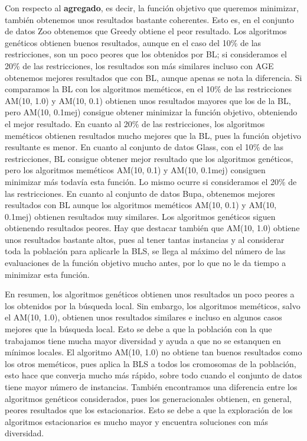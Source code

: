 Con respecto al \textbf{agregado}, es decir, la función objetivo que queremos minimizar, también obtenemos unos resultados bastante coherentes. Esto es, en el conjunto de datos Zoo obtenemos que Greedy obtiene el peor resultado. Los algoritmos genéticos obtienen buenos resultados, aunque en el caso del 10\% de las restricciones, 
son un poco peores que los obtenidos por BL; si consideramos el 20\% de las restricciones, los resultados son más similares incluso con AGE obtenemos mejores resultados que con BL, aunque apenas se nota la diferencia. Si comparamos la BL con los algoritmos meméticos, en el 10\% de las restricciones AM(10, 1.0) y AM(10, 0.1) obtienen unos resultados mayores que los de la BL,
pero AM(10, 0.1mej) consigue obtener minimizar la función objetivo, obteniendo el  mejor resultado. En cuanto al 20\% de las restricciones, los algoritmos meméticos obtienen resultados mucho mejores que la BL, pues la función objetivo resultante es menor.
En cuanto al conjunto de datos Glass, con el 10\% de las restricciones, BL consigue obtener mejor resultado que los algoritmos genéticos, pero los algoritmos meméticos AM(10, 0.1) y AM(10, 0.1mej) consiguen minimizar más todavía esta función. Lo mismo ocurre si consideramos el 20\% de las restricciones.
En cuanto al conjunto de datos Bupa, obtenemos mejores resultados con BL aunque los algoritmos meméticos AM(10, 0.1) y AM(10, 0.1mej) obtienen resultados muy similares. Los algoritmos genéticos siguen obtienendo resultados peores. Hay que destacar también que AM(10, 1.0) obtiene unos resultados bastante altos, pues al tener tantas instancias y al considerar toda la población para aplicarle la BLS,
se llega al máximo del número de las evaluaciones de la función objetivo mucho antes, por lo que no le da tiempo a minimizar esta función.

En resumen, los algoritmos genéticos obtienen unos resultados un poco peores a los obtenidos por la búsqueda local. Sin embargo, los algoritmos meméticos, salvo el AM(10, 1.0), obtienen unos resultados similares e incluso en algunos casos mejores que la búsqueda local.
Esto se debe a que la población con la que trabajamos tiene mucha mayor diversidad y ayuda a que no se estanquen en mínimos locales. 
El algoritmo AM(10, 1.0) no obtiene tan buenos resultados como los otros meméticos, pues aplica la BLS a todos los cromosomas de la población,
esto hace que converja mucho más rápido, sobre todo cuando el conjunto de datos tiene mayor número de instancias.
También encontramos una diferencia entre los algoritmos genéticos considerados, pues los generacionales obtienen, en general, peores resultados que los estacionarios. Esto se debe a que la exploración de los algoritmos estacionarios es mucho mayor y encuentra soluciones con más diversidad.


